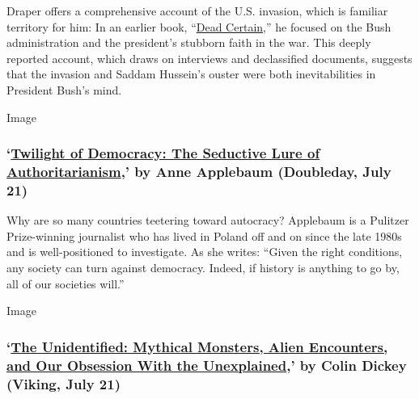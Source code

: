 Draper offers a comprehensive account of the U.S. invasion, which is
familiar territory for him: In an earlier book,
``\href{https://www.nytimes.com/2007/11/04/books/review/Lewis3-t.html}{Dead
Certain},'' he focused on the Bush administration and the president's
stubborn faith in the war. This deeply reported account, which draws on
interviews and declassified documents, suggests that the invasion and
Saddam Hussein's ouster were both inevitabilities in President Bush's
mind.

Image

\hypertarget{twilight-of-democracy-the-seductive-lure-of-authoritarianism-by-anne-applebaum-doubleday-july-21}{%
\subsubsection{\texorpdfstring{`\href{https://www.penguinrandomhouse.com/books/621076/twilight-of-democracy-by-anne-applebaum/}{Twilight
of Democracy: The Seductive Lure of Authoritarianism},' by Anne
Applebaum (Doubleday, July
21)}{`Twilight of Democracy: The Seductive Lure of Authoritarianism,' by Anne Applebaum (Doubleday, July 21)}}\label{twilight-of-democracy-the-seductive-lure-of-authoritarianism-by-anne-applebaum-doubleday-july-21}}

Why are so many countries teetering toward autocracy? Applebaum is a
Pulitzer Prize-winning journalist who has lived in Poland off and on
since the late 1980s and is well-positioned to investigate. As she
writes: ``Given the right conditions, any society can turn against
democracy. Indeed, if history is anything to go by, all of our societies
will.''

Image

\hypertarget{the-unidentified-mythical-monsters-alien-encounters-and-our-obsession-with-the-unexplained-by-colin-dickey-viking-july-21}{%
\subsubsection{\texorpdfstring{`\href{https://www.penguinrandomhouse.com/books/564449/the-unidentified-by-colin-dickey/}{The
Unidentified: Mythical Monsters, Alien Encounters, and Our Obsession
With the Unexplained},' by Colin Dickey (Viking, July
21)}{`The Unidentified: Mythical Monsters, Alien Encounters, and Our Obsession With the Unexplained,' by Colin Dickey (Viking, July 21)}}\label{the-unidentified-mythical-monsters-alien-encounters-and-our-obsession-with-the-unexplained-by-colin-dickey-viking-july-21}}

